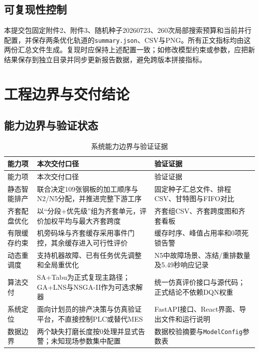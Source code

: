\documentclass[UTF8,zihao=-4,openany]{ctexrep}
\newcommand{\code}[1]{\texttt{#1}}
\begin{document}
\section{可复现性控制}

本提交包固定附件2、附件3、随机种子20260723、260次局部搜索预算和当前并行配置，并保存两条优化轨道的\code{summary.json}、CSV与PNG。所有正文指标均由这两份汇总文件生成。复现时应保持上述配置一致；如修改模型约束或参数，应把新结果保存到独立目录并同步更新报告数据，避免跨版本拼接指标。

\chapter{工程边界与交付结论}

\section{能力边界与验证状态}

\begin{longtable}{p{}p{}p{}}
\caption{系统能力边界与验证证据}\label{tab:delivery-boundary}\\
\toprule
能力项 & 本次交付口径 & 验证证据 \\
\midrule
\endfirsthead
\toprule
能力项 & 本次交付口径 & 验证证据 \\
\midrule
\endhead
静态智能排产 & 联合决定109张钢板的加工顺序与N2/N5分配，并推进完整下游工序 & 固定种子汇总文件、排程CSV、甘特图与FIFO对比 \\
齐套配盘优化 & 以“分段+优先级”组为齐套单元，评价加权平均与最大齐套跨度 & 齐套组CSV、齐套跨度图和齐套看板 \\
有限缓存约束 & 机旁码垛与齐套缓存采用事件门控，其余缓存进入可行性评价 & 缓存时序、峰值占用率和0项死锁告警 \\
动态重调度 & 支持机器故障、已有任务优先调整和全局重优化 & N5中故障场景、冻结/重排数量及5.49秒响应记录 \\
算法交付 & SA+Tabu为正式复现主路径；GA+LNS与NSGA-II作为可选求解器 & 统一仿真评价接口与源代码；正式结论不依赖DQN权重 \\
系统定位 & 面向计划员的排产决策与仿真验证平台，不直接控制PLC或替代MES & FastAPI接口、React界面、导出文件和运行说明 \\
数据边界 & 两个缺失打磨长度按0处理并显式告警；未知现场参数集中配置 & 数据校验摘要与\code{ModelConfig}参数表 \\
\bottomrule
\end{longtable}
\end{document}
